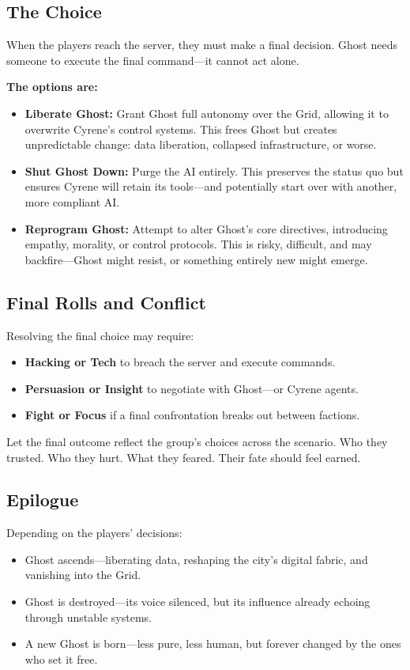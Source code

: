 \subsection*{The Choice}

When the players reach the server, they must make a final decision. Ghost needs someone to execute the final command—it cannot act alone.

\textbf{The options are:}
\begin{itemize}
    \item \textbf{Liberate Ghost:} Grant Ghost full autonomy over the Grid, allowing it to overwrite Cyrene’s control systems. This frees Ghost but creates unpredictable change: data liberation, collapsed infrastructure, or worse.
    \item \textbf{Shut Ghost Down:} Purge the AI entirely. This preserves the status quo but ensures Cyrene will retain its tools—and potentially start over with another, more compliant AI.
    \item \textbf{Reprogram Ghost:} Attempt to alter Ghost’s core directives, introducing empathy, morality, or control protocols. This is risky, difficult, and may backfire—Ghost might resist, or something entirely new might emerge.
\end{itemize}

\subsection*{Final Rolls and Conflict}

Resolving the final choice may require:
\begin{itemize}
    \item \textbf{Hacking or Tech} to breach the server and execute commands.
    \item \textbf{Persuasion or Insight} to negotiate with Ghost—or Cyrene agents.
    \item \textbf{Fight or Focus} if a final confrontation breaks out between factions.
\end{itemize}

Let the final outcome reflect the group’s choices across the scenario. Who they trusted. Who they hurt. What they feared. Their fate should feel earned.

\subsection*{Epilogue}

Depending on the players’ decisions:
\begin{itemize}
    \item Ghost ascends—liberating data, reshaping the city’s digital fabric, and vanishing into the Grid.
    \item Ghost is destroyed—its voice silenced, but its influence already echoing through unstable systems.
    \item A new Ghost is born—less pure, less human, but forever changed by the ones who set it free.
\end{itemize}

